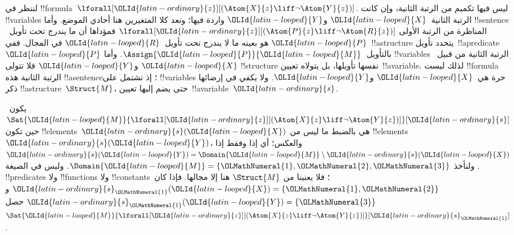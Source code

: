 \documentclass[../../../include/open-logic-section]{subfiles}
\begin{document}
\begin{ex}
  لننظر في !!{formula}~$\lforall[\OLId{latin-ordinary}{z}][(\Atom{X}{z} \liff \lnot
    \Atom{Y}{z})]$. ليس فيها تكميم من الرتبة الثانية، وإن كانت
  !!{variable}s الرتبة الثانية~$\OLId{latin-looped}{X}$ و$\OLId{latin-looped}{Y}$ واردة فيها؛ ونعد كلا
  المتغيرين هنا أحادي الموضع. وأما !!{sentence} المناظرة من الرتبة
  الأولى
  $\lforall[\OLId{latin-ordinary}{z}][(\Atom{P}{z} \liff \lnot \Atom{R}{z})]$ فمؤداها أن
  ما يندرج تحت تأويل~$\OLId{latin-looped}{P}$ هو بعينه ما لا يندرج تحت تأويل~$\OLId{latin-looped}{R}$ في المجال.
  ففي~!!a{structure} يتحدد تأويل~!!a{predicate}~$\OLId{latin-looped}{P}$
  بالتأويل~$\Assign{\OLId{latin-looped}{P}}{\OLId{latin-looped}{M}}$. وأما !!{variable}s الرتبة الثانية
  من قبيل~$\OLId{latin-looped}{X}$ و$\OLId{latin-looped}{Y}$ فلا تتولى !!{structure} نفسها تأويلها، بل يتولاه
  تعيين~!!a{variable}. لذلك ليست !!{formula} الرتبة الثانية هذه
  !!a{sentence}؛ إذ تشتمل على !!{variable}s حرة هي~$\OLId{latin-looped}{X}$ و$\OLId{latin-looped}{Y}$.
  ولا يكفي في إرضائها ذكر !!a{structure}~$\Struct{M}$، حتى يضم
  إليها تعيين~!!a{variable}~$\OLId{latin-ordinary}{s}$.

  يكون~$\Sat{\OLId{latin-looped}{M}}{\lforall[\OLId{latin-ordinary}{z}][(\Atom{X}{z} \liff \lnot
    \Atom{Y}{z})]}[\OLId{latin-ordinary}{s}]$ حين تكون !!{element}s~$\OLId{latin-ordinary}{s}(\OLId{latin-looped}{X})$ هي بالضبط
  ما ليس من !!{element}s~$\OLId{latin-ordinary}{s}(\OLId{latin-looped}{Y})$، والعكس؛ أي إذا وفقط إذا
  $\OLId{latin-ordinary}{s}(\OLId{latin-looped}{Y}) = \Domain{\OLId{latin-looped}{M}} \setminus \OLId{latin-ordinary}{s}(\OLId{latin-looped}{X})$. ولنأخذ
  $\Domain{\OLId{latin-looped}{M}} = \{\OLMathNumeral{1}, \OLMathNumeral{2}, \OLMathNumeral{3}\}$. وليس في الصيغة !!{predicate}s
  ولا !!{function}s ولا !!{constant}s؛ فلا يعنينا من
  $\Struct{M}$ هنا إلا مجالها.
  فإذا كان~$\OLId{latin-ordinary}{s}_\OLMathNumeral{1}(\OLId{latin-looped}{X}) = \{\OLMathNumeral{1}, \OLMathNumeral{2}\}$ و$\OLId{latin-ordinary}{s}_\OLMathNumeral{1}(\OLId{latin-looped}{Y}) = \{\OLMathNumeral{3}\}$ حصل
  $\Sat{\OLId{latin-looped}{M}}{\lforall[\OLId{latin-ordinary}{z}][(\Atom{X}{z}
      \liff \lnot \Atom{Y}{z})]}[\OLId{latin-ordinary}{s}_\OLMathNumeral{1}]$.


\end{ex}
\end{document}
